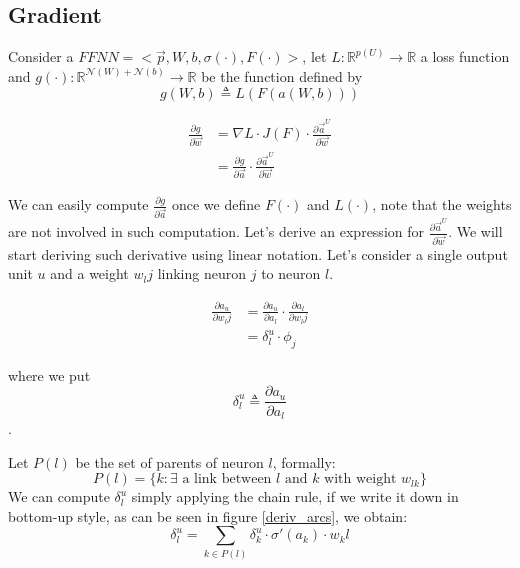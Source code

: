\subsection{Gradient}
Consider a $FFNN=<\vec{p},W,b,\sigma(\cdot),F(\cdot)>$, let $L:\mathbb{R}^{p(U)} \rightarrow \mathbb{R}$ a loss function and 
$g(\cdot):\mathbb{R}^{\mathcal{N}(W)+\mathcal{N}(b)} \rightarrow \mathbb{R}$ be the function defined by
$$g(W,b) \triangleq L(F(a(W,b)))$$


\begin{align}
\frac{\partial g}{\partial \vec{w}} &= \nabla L \cdot J(F) \cdot \frac{\partial \vec{a}^U}{\partial \vec{w}}\\
&= \frac{\partial g}{\partial \vec{a}} \cdot \frac{\partial \vec{a}^U}{\partial \vec{w}}
\end{align}


We can easily compute $\frac{\partial g}{\partial \vec{a}}$ once we define $F(\cdot)$ and $L(\cdot)$, note that the weights are not involved in such computation.
Let's derive an expression for $\frac{\partial \vec{a}^U}{\partial \vec{w}}$.
We will start deriving such derivative using linear notation. Let's consider a single output unit $u$ and a weight $w_lj$ linking neuron $j$ to neuron $l$.


\begin{align}
\frac{\partial a_u}{\partial w_lj} &= \frac{\partial a_u}{\partial a_l} \cdot \frac{\partial a_l}{\partial w_lj}\\
&=\delta_l^u \cdot \phi_j
\end{align}

where we put $$\delta_l^u \triangleq \frac{\partial a_u}{\partial a_l}$$.

Let $P(l)$ be the set of parents of neuron $l$, formally:
\begin{equation} 
P(l) = \{ k: \exists \text{ a link between $l$ and $k$ with weight } w_{lk} \}
\end{equation}
We can compute $\delta_l^u$ simply applying the chain rule, if we write it down in bottom-up style, as can be seen in figure \ref{deriv_arcs}, we obtain:
\begin{equation}
\delta_l^u = \sum_{k\in P(l)} \delta_k^u \cdot \sigma'(a_k)\cdot w_kl
\end{equation}

